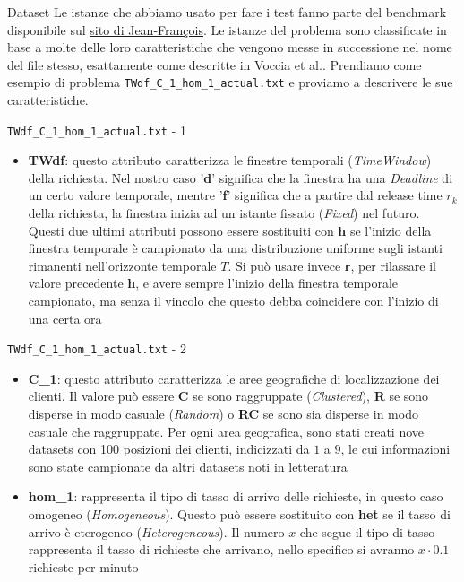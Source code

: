 \documentclass[10pt]{beamer}
\begin{document}
    \begin{frame}{Dataset}
        Le istanze che abbiamo usato per fare i test fanno parte del benchmark disponibile sul \href{https://sites.google.com/view/jfcote/}{sito di Jean-François}. Le istanze del problema sono classificate in base a molte delle loro caratteristiche che vengono messe in successione nel nome del file stesso, esattamente come descritte in Voccia et al.\cite{Voccia}.
        \newline
        \newline
        Prendiamo come esempio di problema \texttt{TWdf\_C\_1\_hom\_1\_actual.txt} e proviamo a descrivere le sue caratteristiche.
    \end{frame}

    \begin{frame}{\texttt{TWdf\_C\_1\_hom\_1\_actual.txt} - 1 }
        \begin{itemize}
            \item \textbf{TWdf}: questo attributo caratterizza le finestre temporali (\textit{TimeWindow}) della richiesta. Nel nostro caso '\textbf{d}' significa che la finestra ha una \textit{Deadline} di un certo valore temporale, mentre '\textbf{f}' significa che a partire dal release time $r_k$ della richiesta, la finestra inizia ad un istante fissato (\textit{Fixed}) nel futuro. Questi due ultimi attributi possono essere sostituiti con \textbf{h} se l'inizio della finestra temporale è campionato da una distribuzione uniforme sugli istanti rimanenti nell'orizzonte temporale $T$. Si può usare invece \textbf{r}, per rilassare il valore precedente \textbf{h}, e avere sempre l'inizio della finestra temporale campionato, ma senza il vincolo che questo debba coincidere con l'inizio di una certa ora
        \end{itemize}
    \end{frame}
    \begin{frame}{\texttt{TWdf\_C\_1\_hom\_1\_actual.txt} - 2}
        \begin{itemize}
            \item \textbf{C\_1}: questo attributo caratterizza le aree geografiche di localizzazione dei clienti. Il valore può essere \textbf{C} se sono raggruppate (\textit{Clustered}), \textbf{R} se sono disperse in modo casuale (\textit{Random}) o \textbf{RC} se sono sia disperse in modo casuale che raggruppate. Per ogni area geografica, sono stati creati nove datasets con 100 posizioni dei clienti, indicizzati da $1$ a $9$, le cui informazioni sono state campionate da altri datasets noti in letteratura
             \item \textbf{hom\_1}: rappresenta il tipo di tasso di arrivo delle richieste, in questo caso omogeneo (\textit{Homogeneous}). Questo può essere sostituito con \textbf{het} se il tasso di arrivo è eterogeneo (\textit{Heterogeneous}). Il numero $x$ che segue  il tipo di tasso rappresenta il tasso di richieste che arrivano, nello specifico si avranno $x\cdot 0.1$ richieste per minuto
        \end{itemize}
    \end{frame}
\end{document}
